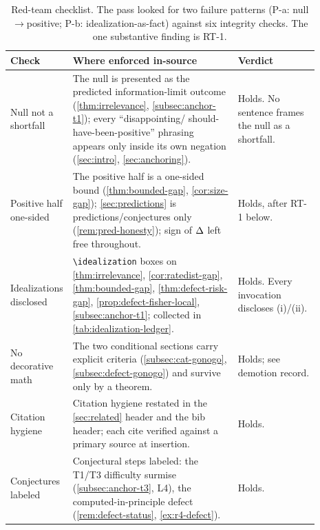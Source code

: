 \begin{table}[t]
\centering
\small
\renewcommand{\arraystretch}{1.25}
\begin{tabular}{@{}>{\raggedright\arraybackslash}p{0.07\linewidth}>{\raggedright\arraybackslash}p{0.55\linewidth}>{\raggedright\arraybackslash}p{0.27\linewidth}@{}}
\toprule
Check & Where enforced in-source & Verdict \\
\midrule
Null not a shortfall & The null is presented as the predicted information-limit outcome
  (\cref{thm:irrelevance}, \cref{subsec:anchor-t1}); every ``disappointing/
  should-have-been-positive'' phrasing appears only inside its own negation
  (\cref{sec:intro}, \cref{sec:anchoring}). & Holds. No sentence frames the null
  as a shortfall. \\
Positive half one-sided & The positive half is a one-sided bound (\cref{thm:bounded-gap},
  \cref{cor:size-gap}); \cref{sec:predictions} is predictions/conjectures only
  (\cref{rem:pred-honesty}); sign of $\Delta$ left free throughout. &
  Holds, after RT-1 below. \\
Idealizations disclosed & \texttt{\textbackslash idealization} boxes on \cref{thm:irrelevance},
  \cref{cor:ratedist-gap}, \cref{thm:bounded-gap}, \cref{thm:defect-risk-gap},
  \cref{prop:defect-fisher-local}, \cref{subsec:anchor-t1}; collected in
  \cref{tab:idealization-ledger}. & Holds. Every invocation discloses (i)/(ii). \\
No decorative math & The two conditional sections carry explicit criteria
  (\cref{subsec:cat-gonogo}, \cref{subsec:defect-gonogo}) and survive only by a
  theorem. & Holds; see demotion record. \\
Citation hygiene & Citation hygiene restated in the \cref{sec:related} header and the bib
  header; each cite verified against a primary source at insertion. & Holds. \\
Conjectures labeled & Conjectural steps labeled: the T1/T3 difficulty surmise
  (\cref{subsec:anchor-t3}, L4), the computed-in-principle defect
  (\cref{rem:defect-status}, \cref{ex:r4-defect}). & Holds. \\
\bottomrule
\end{tabular}
\caption{Red-team checklist. The pass looked for two failure patterns (P-a:
null$\to$positive; P-b: idealization-as-fact) against six integrity checks. The
one substantive finding is RT-1.}
\label{tab:redteam}
\end{table}

